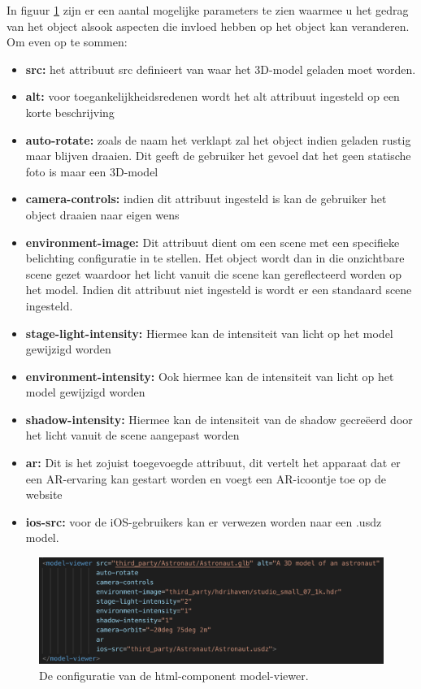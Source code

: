 In figuur \ref{fig:modelviewerhtml} zijn er een aantal mogelijke parameters te zien waarmee u het gedrag van het object alsook aspecten die invloed hebben op het object kan veranderen. Om even op te sommen:

\begin{itemize}
	\item \textbf{src:} het attribuut src definieert van waar het 3D-model geladen moet worden.
	\item \textbf{alt:} voor toegankelijkheidsredenen wordt het alt attribuut ingesteld op een korte beschrijving 
	\item \textbf{auto-rotate:} zoals de naam het verklapt zal het object indien geladen rustig maar blijven draaien. Dit geeft de gebruiker het gevoel dat het geen statische foto is maar een 3D-model 
	\item \textbf{camera-controls:} indien dit attribuut ingesteld is kan de gebruiker het object draaien naar eigen wens 
	\item \textbf{environment-image:} Dit attribuut dient om een scene met een specifieke belichting configuratie in te stellen. Het object wordt dan in die onzichtbare scene gezet waardoor het licht vanuit die scene kan gereflecteerd worden op het model. Indien dit attribuut niet ingesteld is wordt er een standaard scene ingesteld. 
	\item \textbf{stage-light-intensity:} Hiermee kan de intensiteit van licht op het model gewijzigd worden
	\item \textbf{environment-intensity:} Ook hiermee kan de intensiteit van licht op het model gewijzigd worden
	\item \textbf{shadow-intensity:} Hiermee kan de intensiteit van de shadow gecreëerd door het licht vanuit de scene aangepast worden 
	\item \textbf{ar:} Dit is het zojuist toegevoegde attribuut, dit vertelt het apparaat dat er een AR-ervaring kan gestart worden en voegt een AR-icoontje toe op de website 
	\item \textbf{ios-src:} voor de iOS-gebruikers kan er verwezen worden naar een .usdz model.
\end{itemize}

\begin{figure}
	\includegraphics[width=\linewidth]{img/modelviewerhtml.png}
	\caption{De configuratie van de html-component model-viewer.}
	\label{fig:modelviewerhtml}
\end{figure}

